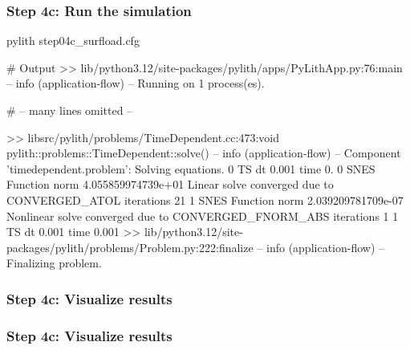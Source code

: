 \documentclass[aspectratio=169]{beamer}
\begin{document}
\begin{frame}[fragile]
  \frametitle{Step 4c: Run the simulation}
  \summary{}

\begin{pyrejournal}
pylith step04c_surfload.cfg

# Output
 >> lib/python3.12/site-packages/pylith/apps/PyLithApp.py:76:main
 -- info (application-flow)
 -- Running on 1 process(es).

# -- many lines omitted --

 >> libsrc/pylith/problems/TimeDependent.cc:473:void pylith::problems::TimeDependent::solve()
 -- info (application-flow)
 -- Component 'timedependent.problem': Solving equations.
0 TS dt 0.001 time 0.
    0 SNES Function norm 4.055859974739e+01
      Linear solve converged due to CONVERGED_ATOL iterations 21
    1 SNES Function norm 2.039209781709e-07
    Nonlinear solve converged due to CONVERGED_FNORM_ABS iterations 1
1 TS dt 0.001 time 0.001
 >> lib/python3.12/site-packages/pylith/problems/Problem.py:222:finalize
 -- info (application-flow)
 -- Finalizing problem.
\end{pyrejournal}
  
\end{frame}


\begin{frame}
  \frametitle{Step 4c: Visualize results}

    
\end{frame}


\begin{frame}
  \frametitle{Step 4c: Visualize results}

    
\end{frame}
\end{document}
